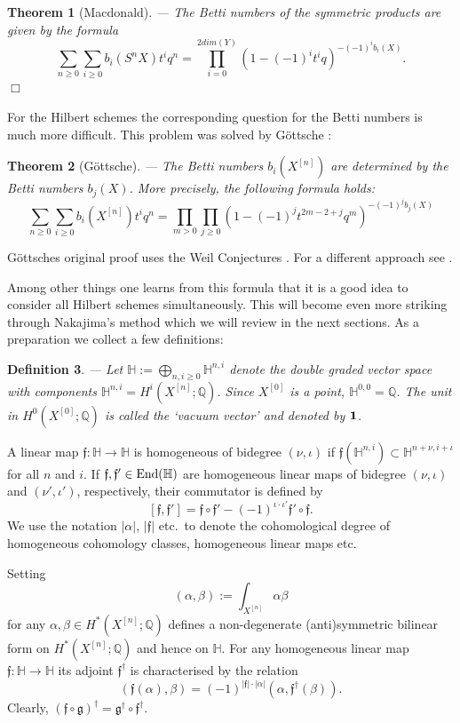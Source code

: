 \documentclass[twoside,11pt]{article}
\newtheorem{theorem}{Theorem}[section]
\newtheorem{definition}[theorem]{Definition}
\newcommand{\qed}{\hspace*{\fill}$\Box$\vspace{2ex}}
\newcommand{\IH}{{\mathbb H}}
\newcommand{\IQ}{{\mathbb Q}}
\newcommand{\gothf}{{\mathfrak f}}
\newcommand{\gothg}{{\mathfrak g}}
\newcommand{\End}{{\rm End}}
\newcommand{\vacuum}{{\bf 1}}
\begin{document}
\begin{theorem}[Macdonald]--- 
The Betti numbers of the symmetric products are given by the formula
$$\sum_{n\geq0}\sum_{i\geq0}b_i(S^nX)t^iq^n=
\prod_{i=0}^{2dim(Y)}(1-(-1)^it^iq)^{-(-1)^ib_i(X)}.$$\qed
\end{theorem}

For the Hilbert schemes the corresponding question for the Betti numbers is
much more difficult. This problem was solved by G\"ottsche \cite{Goettsche}:

\begin{theorem}[G\"ottsche]\label{GoettschesFormel}--- The Betti numbers $b_i(X^{[n]})$ are determined by the Betti numbers $b_j(X)$. More precisely,
the following formula holds:
$$\sum_{n\geq0}\sum_{i\geq0}b_i(X^{[n]})t^iq^n=\prod_{m>0}\prod_{j\geq0}(1-(-1)^{j}t^{2m-2+j}q^{m})^{-(-1)^jb_j(X)}$$
\end{theorem}

G\"ottsches original proof uses the Weil Conjectures \cite{Goettsche}. For a
different approach see \cite{Cheah}.

Among other things one learns from this formula that it is a good idea
to consider all Hilbert schemes simultaneously. This will become even more
striking through Nakajima's method which we will review in the next sections.
As a preparation we collect a few definitions:

\begin{definition}--- Let $\IH:=\bigoplus_{n,i\geq 0}\IH^{n,i}$ denote the
double graded vector space with components $\IH^{n,i}=H^i(X^{[n]};\IQ)$.
Since $X^{[0]}$ is a point, $\IH^{0,0}=\IQ$. The unit in $H^0(X^{[0]};\IQ)$ is called the `vacuum vector' and denoted by $\vacuum$.
\end{definition}

A linear map $\gothf:\IH\to\IH$ is homogeneous of bidegree $(\nu,\iota)$ if
$\gothf(\IH^{n,i})\subset\IH^{n+\nu,i+\iota}$ for all $n$ and $i$. If $\gothf,\gothf'\in \End(\IH)$
are homogeneous linear maps of bidegree $(\nu,\iota)$ and $(\nu',\iota')$, 
respectively, their commutator is defined by
$$[\gothf,\gothf']=\gothf\circ\gothf'-(-1)^{\iota\cdot\iota'}\gothf'\circ\gothf.$$
We use the notation $|\alpha|$, $|\gothf|$ etc.\ to denote
the cohomological degree of homogeneous cohomology classes, homogeneous linear
maps etc.

Setting
$$(\alpha,\beta):=\int_{X^{[n]}}\alpha\beta$$
for any $\alpha,\beta\in H^*(X^{[n]};\IQ)$ defines a non-degenerate 
(anti)symmetric bilinear form on $H^*(X^{[n]};\IQ)$ and hence on $\IH$.
For any homogeneous linear map $\gothf:\IH\to \IH$ its adjoint
$\gothf^\dagger$ is characterised by the relation
$$(\gothf(\alpha),\beta)=
(-1)^{|\gothf|\cdot|\alpha|}(\alpha,\gothf^\dagger(\beta)).$$
Clearly, $(\gothf\circ\gothg)^\dagger=\gothg^\dagger\circ\gothf^\dagger$.
\end{document}
